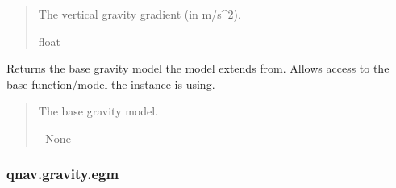 \documentclass[letterpaper,10pt,english]{sphinxmanual}
\begin{document}
\begin{fulllineitems}
\begin{fulllineitems}
\begin{quote}
\begin{description}
\begin{itemize}
\end{itemize}

\sphinxAtStartPar
The vertical gravity gradient (in m/s\textasciicircum{}2).

\sphinxAtStartPar
float

\end{description}\end{quote}

\end{fulllineitems}


\begin{fulllineitems}
\label{\detokenize{modules/gravity/map:qnav.gravity.map.GravityMap.base_model}}
\pysigstartsignatures
{}
\pysigstopsignatures
\sphinxAtStartPar
Returns the base gravity model the model extends from.
Allows access to the base function/model the instance is using.
\begin{quote}\begin{description}
\sphinxAtStartPar
The base gravity model.

\sphinxAtStartPar
{\hyperref[\detokenize{modules/gravity/base:qnav.gravity.base.GravityModel}]{}} | None

\end{description}\end{quote}

\end{fulllineitems}


\end{fulllineitems}


\sphinxstepscope


\subsubsection{qnav.gravity.egm}
\label{\detokenize{modules/gravity/egm:module-qnav.gravity.egm}}\label{\detokenize{modules/gravity/egm:qnav-gravity-egm}}\label{\detokenize{modules/gravity/egm::doc}}
\end{document}
